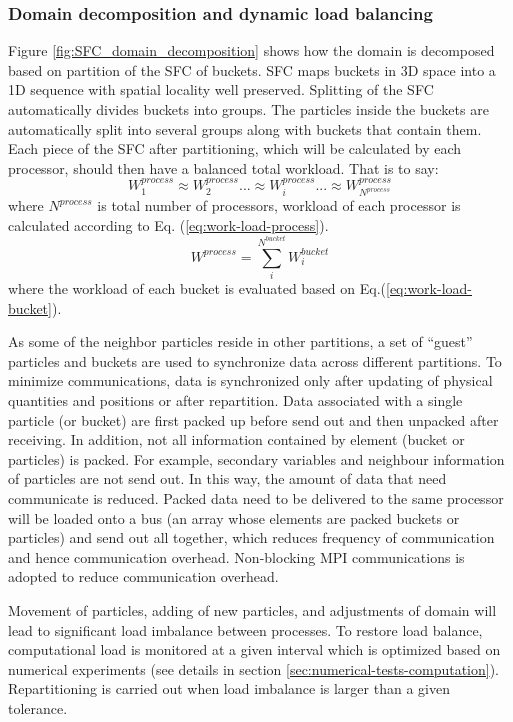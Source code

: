 \subsubsection{Domain decomposition and dynamic load balancing}
Figure \ref{fig:SFC_domain_decomposition} shows how the domain is decomposed based on partition of the SFC of buckets. SFC maps buckets in 3D space into a 1D sequence with spatial locality well preserved. Splitting of the SFC automatically divides buckets into groups. The particles inside the buckets are automatically split into several groups along with buckets that contain them. Each piece of the SFC after partitioning, which will be calculated by each processor, should then have a balanced total workload. That is to say:
\begin{equation}
W^{process}_1 \approx W^{process}_2 ... \approx W^{process}_i ...\approx W^{process}_{N^{process}}
\label{eq:work-load-balance}
\end{equation}
where $N^{process}$ is total number of processors, workload of each processor is calculated according to Eq. (\ref{eq:work-load-process}).
\begin{equation}
W^{process} = \sum_i^{N^{bucket}} W_i^{bucket}
\label{eq:work-load-process}
\end{equation}
where the workload of each bucket is evaluated based on Eq.(\ref{eq:work-load-bucket}).

As some of the neighbor particles reside in other partitions, a set of ``guest'' particles and buckets are used to synchronize data across different partitions. To minimize communications, data is synchronized only after updating of physical quantities and positions or after repartition. Data associated with a single particle (or bucket) are first packed up before send out and then unpacked after receiving. In addition, not all information contained by element (bucket or particles) is packed. For example, secondary variables and neighbour information of particles are not send out. In this way, the amount of data that need communicate is reduced. Packed data need to be delivered to the same processor will be loaded onto a bus (an array whose elements are packed buckets or particles) and send out all together, which reduces frequency of communication and hence communication overhead. Non-blocking MPI communications is adopted to reduce communication overhead.

Movement of particles, adding of new particles, and adjustments of domain will lead to significant load imbalance between processes. To restore load balance, computational load is monitored at a given interval which is optimized based on numerical experiments (see details in section \ref{sec:numerical-tests-computation}). Repartitioning is carried out when load imbalance is larger than a given tolerance.


